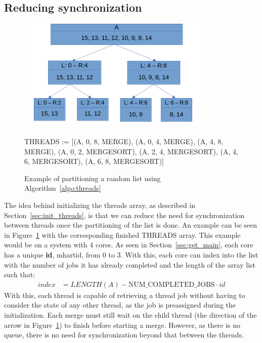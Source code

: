 \subsection{Reducing synchronization}
\begin{figure}
  \begin{center}
    \includegraphics[width=0.85\textwidth]{figures/mergesort.png}
  \end{center}
  THREADS := [(A, 0, 8, MERGE), (A, 0, 4, MERGE), (A, 4, 8, MERGE), (A, 0, 2,
  MERGESORT), (A, 2, 4, MERGESORT), (A, 4, 6, MERGESORT), (A, 6, 8, MERGESORT)]
  \caption{Example of partitioning a random list using
  Algorithm~\ref{algo:threads}}\label{fig:mergesort}
\end{figure}

The idea behind initializing the threads array, as described in
Section~\ref{sec:init_threads}, is that we can reduce the need for
synchronization between threads once the partitioning of the list is done. An
example can be seen in Figure~\ref{fig:mergesort} with the corresponding
finished THREADS array. This example would be on a system with 4 cores. As seen
in Section~\ref{sec:get_main}, each core has a unique \textbf{id}, mhartid, from 0 to 3.
With this, each core can index into the list with the number of jobs it has
already completed and the length of the array list such that:
\begin{align}
  index &= LENGTH(A) - \text{NUM\_COMPLETED\_JOBS}\cdot id
\end{align}
With this, each thread is capable of retrieving a thread job without having to
consider the state of any other thread, as the job is preassigned during the
initialization. Each merge must still wait on the child thread (the direction of
the arrow in Figure~\ref{fig:mergesort}) to finish before starting a merge.
However, as there is no queue, there is no need for synchronization beyond that
between the threads.



